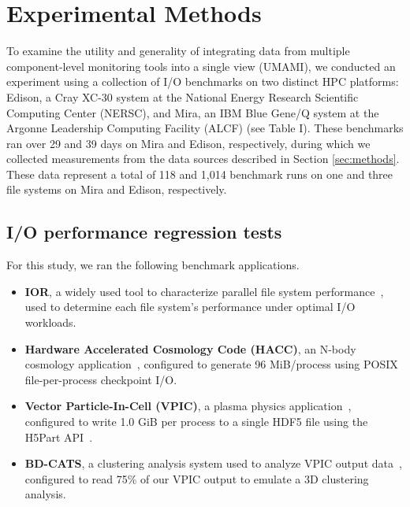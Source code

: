 

\section{Experimental Methods} \label{sec:platforms}

To examine the utility and generality of integrating data from multiple component-level monitoring tools into a single view (UMAMI), we conducted an experiment using a collection of I/O benchmarks on two distinct HPC platforms:
Edison, a Cray XC-30 system at the National Energy Research Scientific Computing Center (NERSC), and Mira, an IBM Blue Gene/Q system at the Argonne Leadership Computing Facility (ALCF) (see Table I).
These benchmarks ran over 29 and 39 days on Mira and Edison, respectively, during which we collected measurements from the data sources described in Section \ref{sec:methods}.  These data represent a total of 118 and 1,014 benchmark runs on one and three file systems on Mira and Edison, respectively.

\subsection{I/O performance regression tests} \label{sec:methods/tests}

\noindent
For this study, we ran the following benchmark applications.

\begin{itemize}[leftmargin=*]
\item
\textbf{IOR}, a widely used tool to characterize parallel file system performance~\cite{Yildiz2016,Xie2012,Lofstead2010,Uselton2010}, used to determine each file system's performance under optimal I/O workloads.
\item 
\textbf{Hardware Accelerated Cosmology Code (HACC)}, an N-body cosmology application~\cite{habib2012}, configured to generate 96 MiB/process using POSIX file-per-process checkpoint I/O.
 \item
\textbf{Vector Particle-In-Cell (VPIC)}, a plasma physics application~\cite{Bowers2008}, configured to write 1.0 GiB per process to a single HDF5 file using the H5Part API~\cite{H5Part}. 
 \item
\textbf{BD-CATS}, a clustering analysis system used to analyze VPIC output data~\cite{Patwary2015},  configured to read 75\% of our VPIC output to emulate a 3D clustering analysis.
 \end{itemize}

